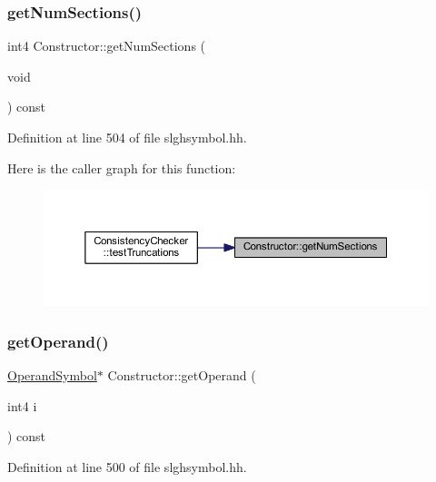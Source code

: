 \subsubsection{\texorpdfstring{getNumSections()}{getNumSections()}}
{\footnotesize\ttfamily int4 Constructor\+::get\+Num\+Sections (\begin{DoxyParamCaption}\item[{void}]{ }\end{DoxyParamCaption}) const\hspace{0.3cm}{\ttfamily [inline]}}



Definition at line 504 of file slghsymbol.\+hh.

Here is the caller graph for this function\+:
\nopagebreak
\begin{figure}[H]
\begin{center}
\leavevmode
\includegraphics[width=350pt]{class_constructor_a335da57fe897b45b88acfd433b6338df_icgraph}
\end{center}
\end{figure}
\mbox{\label{class_constructor_af59778488eafa4569c35b0c295be6f1f}} 
\subsubsection{\texorpdfstring{getOperand()}{getOperand()}}
{\footnotesize\ttfamily \mbox{\hyperlink{class_operand_symbol}{Operand\+Symbol}}$\ast$ Constructor\+::get\+Operand (\begin{DoxyParamCaption}\item[{int4}]{i }\end{DoxyParamCaption}) const\hspace{0.3cm}{\ttfamily [inline]}}



Definition at line 500 of file slghsymbol.\+hh.

